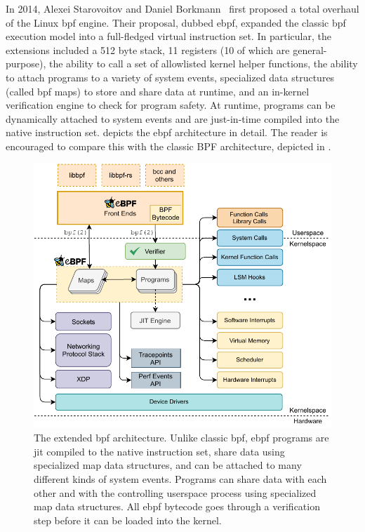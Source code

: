 In 2014, Alexei Starovoitov and Daniel Borkmann~\cite{starovoitov2014_ebpf} first proposed
a total overhaul of the Linux \gls{bpf} engine. Their proposal, dubbed \gls{ebpf}, expanded the
classic \gls{bpf} execution model into a full-fledged virtual instruction set. In particular,
the extensions included a 512 byte stack, 11 registers (10 of which are general-purpose),
the ability to call a set of allowlisted kernel helper functions, the ability to attach
programs to a variety of system events, specialized data structures (called \gls{bpf} maps) to
store and share data at runtime, and an in-kernel verification engine to check for program
safety. At runtime, programs can be dynamically attached to system events and are
just-in-time compiled into the native instruction set.   depicts
the \gls{ebpf} architecture in detail. The reader is encouraged to compare this with the classic
BPF architecture, depicted in .

\begin{figure}[tbp]
  \centering
  \includegraphics[width=0.8\linewidth]{figs/background/ebpf.pdf}
  \caption[The extended BPF architecture]{The extended \gls{bpf} architecture. Unlike classic
  \gls{bpf}, \gls{ebpf} programs are \gls{jit} compiled to the native instruction set, share data using
  specialized map data structures, and can be attached to many different kinds of system
  events. Programs can share data with each other and with the controlling userspace
  process using specialized map data structures. All \gls{ebpf} bytecode goes through
  a verification step before it can be loaded into the kernel.}%
  \label{fig:extended-bpf}
\end{figure}

